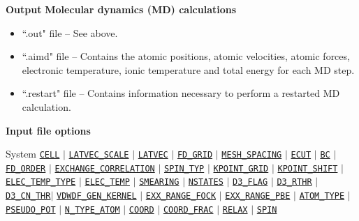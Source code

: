 \documentclass[xcolor=dvipsnames,t]{beamer}
\begin{document}
\begin{frame}{\textbf{Output}}
\textbf{Molecular dynamics (MD) calculations}  \\
\begin{itemize}
  \item ``.out" file -- See above.
  \item ``.aimd" file -- Contains the atomic positions, atomic velocities, atomic forces, electronic temperature, ionic temperature and total energy for each MD step.
  \item ``.restart" file -- Contains information necessary to perform a restarted MD calculation. 
\end{itemize}

\end{frame}



\begin{frame}[allowframebreaks]{\textbf{Input file options}} \label{Index}
\vspace{-2mm}
\begin{block}{System}
\hyperlink{CELL}{\texttt{CELL}} $\vert$ 
\hyperlink{LATVEC_SCALE}{\texttt{LATVEC\_SCALE}} $\vert$ 
\hyperlink{LATVEC}{\texttt{LATVEC}}  $\vert$ 
\hyperlink{FD_GRID}{\texttt{FD\_GRID}} $\vert$ 
\hyperlink{MESH_SPACING}{\texttt{MESH\_SPACING}} $\vert$ 
\hyperlink{ECUT}{\texttt{ECUT}} $\vert$ 
\hyperlink{BC}{\texttt{BC}} $\vert$ 
\hyperlink{FD_ORDER}{\texttt{FD\_ORDER}} $\vert$ 
\hyperlink{EXCHANGE_CORRELATION}{\texttt{EXCHANGE\_CORRELATION}} $\vert$ 
\hyperlink{SPIN_TYP}{\texttt{SPIN\_TYP}} $\vert$ 
\hyperlink{KPOINT_GRID}{\texttt{KPOINT\_GRID}} $\vert$ 
\hyperlink{KPOINT_SHIFT}{\texttt{KPOINT\_SHIFT}} $\vert$ 
\hyperlink{ELEC_TEMP_TYPE}{\texttt{ELEC\_TEMP\_TYPE}} $\vert$ 
\hyperlink{ELEC_TEMP}{\texttt{ELEC\_TEMP}} $\vert$ 
\hyperlink{SMEARING}{\texttt{SMEARING}} $\vert$ 
\hyperlink{NSTATES}{\texttt{NSTATES}}    $\vert$ 
\hyperlink{D3_FLAG}{\texttt{D3\_FLAG}} $\vert$ 
\hyperlink{D3_RTHR}{\texttt{D3\_RTHR}} $\vert$ 
\hyperlink{D3_CN_THR}{\texttt{D3\_CN\_THR}}$\vert$ 
\hyperlink{VDWDF_GEN_KERNEL}{\texttt{VDWDF\_GEN\_KERNEL}} $\vert$ 
\hyperlink{EXX_RANGE_FOCK}{\texttt{EXX\_RANGE\_FOCK}} $\vert$  
\hyperlink{EXX_RANGE_PBE}{\texttt{EXX\_RANGE\_PBE}} $\vert$ 
\hyperlink{ATOM_TYPE}{\texttt{ATOM\_TYPE}} $\vert$ 
\hyperlink{PSEUDO_POT}{\texttt{PSEUDO\_POT}}  $\vert$ 
\hyperlink{N_TYPE_ATOM}{\texttt{N\_TYPE\_ATOM}} $\vert$ 
\hyperlink{COORD}{\texttt{COORD}} $\vert$ 
\hyperlink{COORD_FRAC}{\texttt{COORD\_FRAC}} $\vert$ 
\hyperlink{RELAX}{\texttt{RELAX}} $\vert$ 
\hyperlink{SPIN}{\texttt{SPIN}}
\end{block}


\end{frame}
\end{document}
